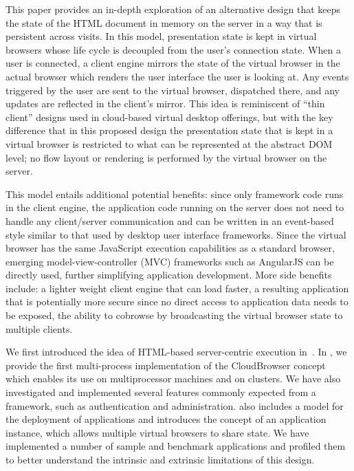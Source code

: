 This paper provides an in-depth exploration of an alternative design that keeps the state 
of the HTML document in memory on the server in a way that is persistent across visits.
In this model, presentation state is kept in virtual browsers whose life
cycle is decoupled from the user's connection state.  When a user is connected,
a client engine mirrors the state of the virtual browser in the actual browser which
renders the user interface the user is looking at.  Any events triggered by the
user are sent to the virtual browser, dispatched there, and any updates
are reflected in the client's mirror.  This idea is reminiscent of 
``thin client'' designs used in cloud-based virtual desktop offerings,
but with the key difference that in this proposed design the presentation state
that is kept in a virtual browser is restricted to what can be represented at the
abstract DOM level; no flow layout or rendering is performed by the virtual browser on the 
server.

This model entails additional potential benefits: since only framework code runs in
the client engine, the application code running on the server does not need
to handle any client/server communication and can be written in an event-based
style similar to that used by desktop user interface frameworks.
Since the virtual browser has the same JavaScript execution capabilities as a
standard browser, emerging model-view-controller (MVC) frameworks such as 
AngularJS can be directly used, further simplifying application development.
More side benefits include: a lighter weight client engine that can load faster,
a resulting application that is potentially more secure since no direct access to
application data needs to be exposed, the ability to cobrowse by broadcasting
the virtual browser state to multiple clients.

We first introduced the idea of HTML-based server-centric execution
in~\cite{mcdaniel2012cloudbrowser}.  In \cbtwo, we provide the first
multi-process implementation of the CloudBrowser concept which enables its use on multiprocessor
machines and on clusters. We have also investigated and implemented several features
commonly expected from a framework, such as authentication and administration.
\cbtwo also includes a model for the deployment of applications and introduces the
concept of an application instance, which allows multiple virtual browsers to share
state.  We have implemented a number of sample and benchmark
applications and profiled them to better understand the intrinsic and extrinsic
limitations of this design.

%
%
%
%
%

\architectureoverview{}

